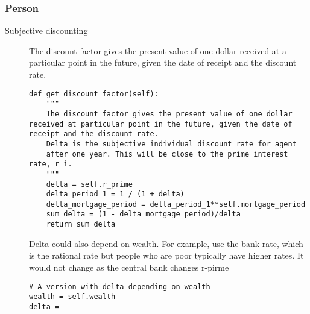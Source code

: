     \subsubsection{Person}
\begin{description}
\item[Subjective discounting] The discount factor gives the present value of one dollar received at a particular point in the future, given the date of receipt and the discount rate.
\begin{lstlisting}
def get_discount_factor(self):
    """
    The discount factor gives the present value of one dollar received at particular point in the future, given the date of receipt and the discount rate.
    Delta is the subjective individual discount rate for agent
    after one year. This will be close to the prime interest rate, r_i.
    """    
    delta = self.r_prime
    delta_period_1 = 1 / (1 + delta) 
    delta_mortgage_period = delta_period_1**self.mortgage_period
    sum_delta = (1 - delta_mortgage_period)/delta
    return sum_delta
\end{lstlisting}
Delta could also depend on wealth. For example,  use the bank rate, which is the rational rate but people who are poor typically have higher rates.  It would not change as the central bank changes r-pirme


\begin{lstlisting}
# A version with delta depending on wealth
wealth = self.wealth
delta =
\end{lstlisting}


\end{description}

